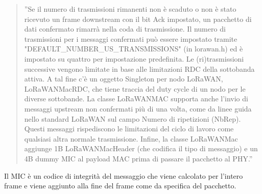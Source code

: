\documentclass[a4paper]{report} %
\begin{document}
\begin{quote}
	''Se il numero di trasmissioni rimanenti non è scaduto o non è stato ricevuto un frame downstream con il bit Ack impostato, un pacchetto di dati confermato rimarrà nella coda di trasmissione. Il numero di trasmissioni per i messaggi confermati può essere impostato tramite "DEFAULT\_NUMBER\_US\_TRANSMISSIONS" (in lorawan.h) ed è impostato su quattro per impostazione predefinita. Le (ri)trasmissioni successive vengono limitate in base alle limitazioni RDC della sottobanda attiva. A tal fine c'è un oggetto Singleton per nodo LoRaWAN, LoRaWANMacRDC, che tiene traccia del duty cycle di un nodo per le diverse sottobande. La classe LoRaWANMAC supporta anche l'invio di messaggi upstream non confermati più di una volta, come da linee guida nello standard LoRaWAN sul campo Numero di ripetizioni (NbRep). Questi messaggi rispediscono le limitazioni del ciclo di lavoro come qualsiasi altra normale trasmissione. Infine, la classe LoRaWANMac aggiunge 1B LoRaWANMacHeader (che codifica il tipo di messaggio) e un 4B dummy MIC al payload MAC prima di passare il pacchetto al PHY.''
\end{quote}
Il MIC è un codice di integrità del messaggio che viene calcolato per l'intero frame e viene aggiunto alla fine del frame come da specifica del pacchetto.
\end{document}
